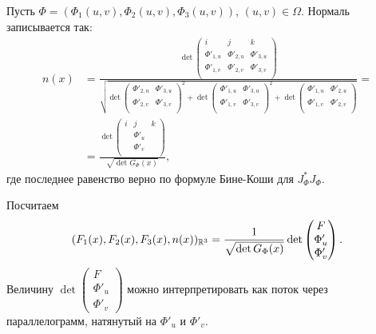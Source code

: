 \begin{remrk}
 Пусть $\Phi = (\Phi_1(u,v), \Phi_2(u,v), \Phi_3(u,v))$, $(u, v) \in \Omega$. Нормаль записывается так:
 \begin{align*}
  n(x) &= \frac{\det \begin{pmatrix}
    i & j & k \\
    \Phi'_{1,u} & \Phi'_{2,u} & \Phi'_{3,u} \\
    \Phi'_{1,v} & \Phi'_{2,v} & \Phi'_{3,v} \\
  \end{pmatrix} }{\sqrt{ \det \begin{pmatrix}
   \Phi'_{2,u} & \Phi'_{3,u} \\
   \Phi'_{2,v} & \Phi'_{3,v} \\
  \end{pmatrix}^{2} + \det \begin{pmatrix}
  \Phi'_{1,u} & \Phi'_{3,u} \\
  \Phi'_{1,v} & \Phi'_{3,v} \\
  \end{pmatrix}^{2} + \det \begin{pmatrix}
  \Phi'_{1,u} & \Phi'_{2,u} \\
  \Phi'_{1,v} & \Phi'_{2,v} \\
  \end{pmatrix} }} = \\
  &=  \frac{\det \begin{pmatrix}
    i & j & k \\
    & \Phi'_u & \\
    & \Phi'_v & \\
  \end{pmatrix}}{\sqrt{\det G_{\Phi}(x)}}
 ,\end{align*} где последнее равенство верно по формуле Бине-Коши для $J_{\Phi}^{\ast} J_{\Phi}$.

 Посчитаем 
\begin{align*}
(F_1(x), F_2(x), F_3(x), n(x))_{\mathbb{R}^{3}} = \frac{1}{\sqrt{\det G_{\Phi}(x)}} \det \begin{pmatrix}
   F \\
   \Phi'_u \\
   \Phi'_v \\
  \end{pmatrix}
 .\end{align*} Величину $\det \begin{pmatrix}
  F \\
  \Phi'_u \\
  \Phi'_v
 \end{pmatrix}$ можно интерпретировать как поток через параллелограмм, натянутый на $\Phi'_u$ и $\Phi'_v$.
\end{remrk}

